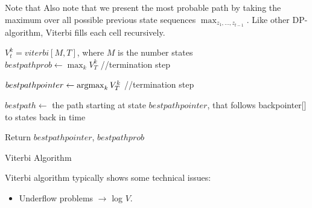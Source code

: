 Note that  Also note that we present the most probable path by taking the maximum over all possible previous state sequences $\max_{z_1,\dots,z_{t-1}}$. Like other DP-algorithm, Viterbi fills each cell recursively. 

\begin{algorithm}
	$V_t^k = viterbi[M,T]$, where $M$ is the number states\\
	$bestpathprob \leftarrow \max_{k}V_T^{k}$ \quad //termination step
	
	$bestpathpointer \leftarrow \operatorname*{\operatorname{argmax}}_{k}V_T^{k}$ \quad//termination step
	
	$bestpath \leftarrow $ the path starting at state $bestpathpointer$, that follows backpointer[] to states back in time
	
	Return $bestpathpointer$, $bestpathprob$

	\caption{Viterbi Algorithm}
	\label{algo:viterbi}
\end{algorithm}

Viterbi algorithm typically shows some technical issues:
\begin{itemize}
	\item Underflow problems $\to$ log $V$.
\end{itemize}
